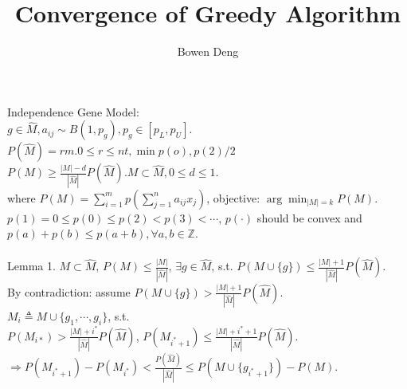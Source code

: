 \documentclass{article}
\title{Convergence of Greedy Algorithm}
\author{Bowen Deng}
\date{}
\begin{document}
\maketitle
Independence Gene Model:\\
$g\in \hat{M}, a_{ij}\sim B(1,p_g), p_g\in[p_L,p_U]$.\\
$P(\hat{M})=rm. 0\leqslant r\leqslant nt, \min{p(o),p(2)}/2$\\
$P(M)\geqslant \frac{|M|-d}{|\hat{M}|}P(\hat{M}). M\subset \hat{M}, 0\leqslant d\leqslant1$.\\
where $P(M)=\sum_{i=1}^mp(\sum_{j=1}^na_{ij}x_j)$, objective: $\arg \min_{|M|=k}P(M)$.\\
$p(1)=0\leqslant p(0)\leqslant p(2)<p(3)<\cdots$, $p(\cdot)$ should be convex and $p(a)+p(b)\leqslant p(a+b), \forall a,b\in \mathbb{Z}$.\\
\\
Lemma 1. $M\subset \hat{M}$, $P(M)\leqslant \frac{|M|}{|\hat{M}|}$, $\exists g\in \hat{M}$, s.t. $P(M\cup \{g\})\leqslant\frac{|M|+1}{|\hat{M}|}P(\hat{M})$.\\
By contradiction: assume $P(M\cup \{g\})>\frac{|M|+1}{|\hat{M}|}P(\hat{M})$.\\
$M_i\triangleq M\cup \{g_1,\cdots,g_i\}$, s.t.\\
$P(M_{i*})>\frac{|M|+i^*}{|\hat{M}|}P(\hat{M})$, $P(M_{i^*+1})\leqslant \frac{|M|+i^*+1}{|\hat{M}|}P(\hat{M})$.\\
$\Rightarrow P(M_{i^*+1})-P(M_{i^*})<\frac{P(\hat{M})}{|\hat{M}|}\leqslant P(M\cup \{g_{i^*+1}\})-P(M)$.\\
\end{document}
